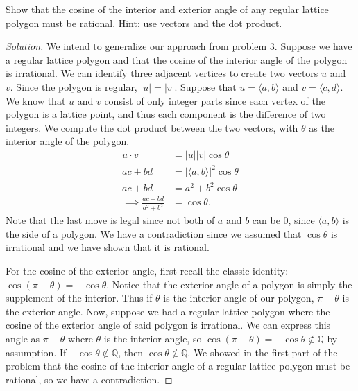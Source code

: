\documentclass[12pt]{article}
\newcommand{\Q}{\mathbb{Q}}
\newenvironment{exercise}[2][Exercise]{\begin{trivlist}
        \item[\hskip \labelsep {\bfseries #1}\hskip \labelsep {\bfseries #2.}]}{\end{trivlist}}
\newenvironment{solution}
        {\begin{proof}[Solution]}
                    {\end{proof}}
\begin{document}
\begin{exercise}{4}
    Show that the cosine of the interior and exterior angle of any regular lattice polygon must be rational. Hint: use vectors and the dot product.
    \begin{solution}
        We intend to generalize our approach from problem 3. Suppose we have a regular lattice polygon and that the cosine of the interior angle of the polygon is irrational. We can identify three adjacent vertices to create two vectors \( u \) and \( v. \) Since the polygon is regular, \( \left| u \right| = \left| v \right| .  \) Suppose that \( u = \langle a,b \rangle \) and \( v = \langle c,d \rangle . \) We know that \( u \) and \( v \) consist of only integer parts since each vertex of the polygon is a lattice point, and thus each component is the difference of two integers. We compute the dot product between the two vectors, with \( \theta \) as the interior angle of the polygon.
        \begin{align*}
            u \cdot v &= \left| u \right| \left| v \right| \cos\theta\\
            ac + bd &= \left| \langle a,b \rangle  \right|^{2} \cos\theta\\
            ac + bd &= a^{2} + b^{2} \cos\theta\\
            \implies\frac{ac + bd}{a^{2} + b^{2}} &= \cos\theta.
        \end{align*}
        Note that the last move is legal since not both of \( a \) and \( b \) can be 0, since \( \langle a,b \rangle \) is the side of a polygon. We have a contradiction since we assumed that \( \cos\theta \) is irrational and we have shown that it is rational.

        For the cosine of the exterior angle, first recall the classic identity: \( \cos ( \pi - \theta ) = -\cos\theta \). Notice that the exterior angle of a polygon is simply the supplement of the interior. Thus if \( \theta \) is the interior angle of our polygon, \( \pi-\theta \) is the exterior angle. Now, suppose we had a regular lattice polygon where the cosine of the exterior angle of said polygon is irrational. We can express this angle as \( \pi-\theta \) where \( \theta \) is the interior angle, so \( \cos(\pi-\theta)=-\cos\theta \notin \Q \) by assumption. If \( -\cos\theta\notin\Q \), then \( \cos\theta\notin\Q. \) We showed in the first part of the problem that the cosine of the interior angle of a regular lattice polygon must be rational, so we have a contradiction.
    \end{solution}
\end{exercise}
\end{document}
